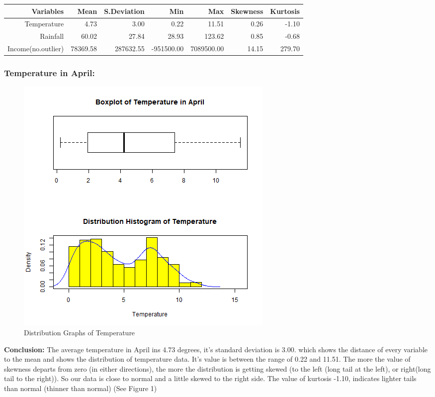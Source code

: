 \documentclass[12pt, a4paper]{article}
\begin{document}
\justify


\begin{table}[H]
\centering
\begin{tabular}{|r|r|r|r|r|r|r|}
  \hline
 Variables & Mean & S.Deviation & Min & Max & Skewness & Kurtosis \\
  \hline
  \hline
Temperature & 4.73 & 3.00 & 0.22 & 11.51 & 0.26 & -1.10 \\ 
  Rainfall & 60.02 & 27.84 & 28.93 & 123.62 & 0.85 & -0.68 \\ 
  Income(no.outlier) & 78369.58 & 287632.55 & -951500.00 & 7089500.00 & 14.15 & 279.70 \\ 
   \hline
\end{tabular}
\end{table}
\justify
\subsubsection{Temperature in April:} 

\begin{figure}[H]
\centering
\includegraphics[trim={0 0 0 2cm}, scale=0.6, clip]{Temperature.png}
\caption{Distribution Graphs of Temperature}
\end{figure}

\justify
\textbf{Conclusion: }The average temperature in April ins 4.73 degrees, it's standard deviation is 3.00. which shows the distance of every variable to the mean and shows the distribution of temperature data. It's value is between the range of 0.22 and 11.51. The more the value of skewness departs from zero (in either directions), the more the distribution is getting skewed (to the left (long tail at the left), or right(long tail to the right)). So our data is close to normal and a little skewed to the right side. The value of kurtosis -1.10, indicates lighter tails than normal (thinner than normal)   (See Figure 1)
\end{document}
